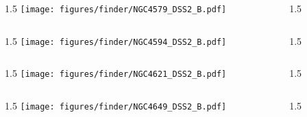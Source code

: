 \documentclass[final]{beamer}
\newlength{\colwidth}
\begin{document}

\begin{frame}[t]{}
    \begin{columns}[T]
        \begin{column}{1.5\colwidth}
            \centering
            \texttt{[image: figures/finder/NGC4579\_DSS2\_B.pdf]}
        \end{column}
        \begin{column}{1.5\colwidth}
            \Large
            
        \end{column}
    \end{columns}
    \vspace{\fill}
    \begin{columns}[T]
        \begin{column}{1.5\colwidth}
            \centering
            \texttt{[image: figures/finder/NGC4594\_DSS2\_B.pdf]}
        \end{column}
        \begin{column}{1.5\colwidth}
            \Large
            
        \end{column}
    \end{columns}
\end{frame}


\begin{frame}[t]{}
    \begin{columns}[T]
        \begin{column}{1.5\colwidth}
            \centering
            \texttt{[image: figures/finder/NGC4621\_DSS2\_B.pdf]}
        \end{column}
        \begin{column}{1.5\colwidth}
            \Large
            
        \end{column}
    \end{columns}
    \vspace{\fill}
    \begin{columns}[T]
        \begin{column}{1.5\colwidth}
            \centering
            \texttt{[image: figures/finder/NGC4649\_DSS2\_B.pdf]}
        \end{column}
        \begin{column}{1.5\colwidth}
            \Large
            
        \end{column}
    \end{columns}
\end{frame}
\end{document}
